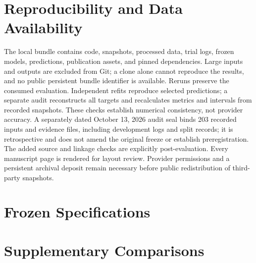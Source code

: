 \documentclass[11pt]{article}
\begin{document}
\section*{Reproducibility and Data Availability}
The local bundle contains code, snapshots, processed data, trial logs, frozen models, predictions, publication assets, and pinned dependencies. Large inputs and outputs are excluded from Git; a clone alone cannot reproduce the results, and no public persistent bundle identifier is available. Reruns preserve the consumed evaluation. Independent refits reproduce selected predictions; a separate audit reconstructs all targets and recalculates metrics and intervals from recorded snapshots. These checks establish numerical consistency, not provider accuracy. A separately dated October 13, 2026 audit seal binds 203 recorded inputs and evidence files, including development logs and split records; it is retrospective and does not amend the original freeze or establish preregistration. The added source and linkage checks are explicitly post-evaluation. Every manuscript page is rendered for layout review. Provider permissions and a persistent archival deposit remain necessary before public redistribution of third-party snapshots.

\clearpage
\appendix
\section{Frozen Specifications}
{\raggedright

}

\clearpage
\section{Supplementary Comparisons}
\begin{table}[htbp]
\centering\footnotesize
\caption{All frozen family finalists and feature-group ablations on the final test. Continuous columns are RMSE; binary columns are Brier scores. Draft order is a separately labeled post-selection benchmark. Models are displayed without test-score ranking or promotion.}
\end{table}

\begin{table}[htbp]
\centering\small
\caption{Selected models by final-test draft class. Different class-level outcomes and errors illustrate why two classes do not establish future-era stability.}
\end{table}
\end{document}
